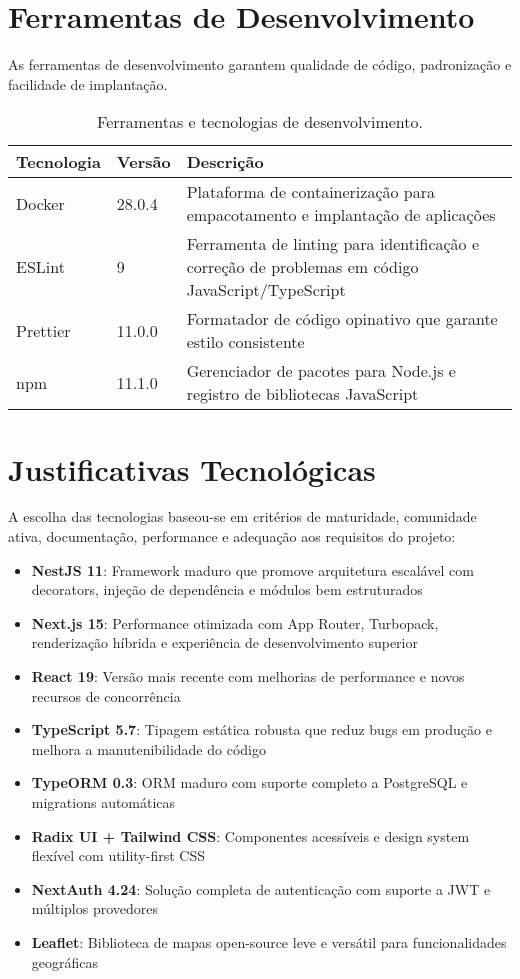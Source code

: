 \section{Ferramentas de Desenvolvimento}

As ferramentas de desenvolvimento garantem qualidade de código, padronização e facilidade de implantação.

\begin{table}[H]
\centering
\caption{Ferramentas e tecnologias de desenvolvimento.}
\label{tab:tecnologias-desenvolvimento}
\begin{tabular}{|p{3cm}|p{2cm}|p{8cm}|}
\hline
\textbf{Tecnologia} & \textbf{Versão} & \textbf{Descrição} \\
\hline
Docker & 28.0.4 & Plataforma de containerização para empacotamento e implantação de aplicações \\
\hline
ESLint & 9 & Ferramenta de linting para identificação e correção de problemas em código JavaScript/TypeScript \\
\hline
Prettier & 11.0.0 & Formatador de código opinativo que garante estilo consistente \\
\hline
npm & 11.1.0 & Gerenciador de pacotes para Node.js e registro de bibliotecas JavaScript \\
\hline
\end{tabular}
\end{table}

\section{Justificativas Tecnológicas}

A escolha das tecnologias baseou-se em critérios de maturidade, comunidade ativa, documentação, performance e adequação aos requisitos do projeto:

\begin{itemize}
  \item \textbf{NestJS 11}: Framework maduro que promove arquitetura escalável com decorators, injeção de dependência e módulos bem estruturados
  \item \textbf{Next.js 15}: Performance otimizada com App Router, Turbopack, renderização híbrida e experiência de desenvolvimento superior
  \item \textbf{React 19}: Versão mais recente com melhorias de performance e novos recursos de concorrência
  \item \textbf{TypeScript 5.7}: Tipagem estática robusta que reduz bugs em produção e melhora a manutenibilidade do código
  \item \textbf{TypeORM 0.3}: ORM maduro com suporte completo a PostgreSQL e migrations automáticas
  \item \textbf{Radix UI + Tailwind CSS}: Componentes acessíveis e design system flexível com utility-first CSS
  \item \textbf{NextAuth 4.24}: Solução completa de autenticação com suporte a JWT e múltiplos provedores
  \item \textbf{Leaflet}: Biblioteca de mapas open-source leve e versátil para funcionalidades geográficas
\end{itemize}

